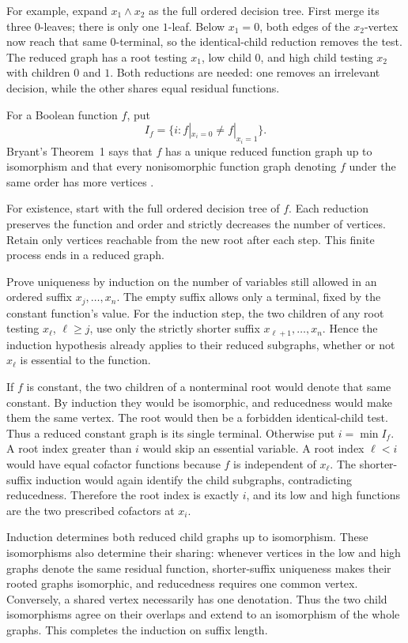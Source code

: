 For example, expand \(x_1\land x_2\) as the full ordered decision tree.
First merge its three \(0\)-leaves; there is only one \(1\)-leaf.
Below \(x_1=0\), both edges of the \(x_2\)-vertex now reach that same
\(0\)-terminal, so the identical-child reduction removes the test.
The reduced
graph has a root testing \(x_1\), low child \(0\), and high child testing
\(x_2\) with children \(0\) and \(1\).  Both reductions are needed: one removes
an irrelevant decision, while the other shares equal residual functions.

For a Boolean function \(f\), put
\[
 I_f=\{i:f|_{x_i=0}\ne f|_{x_i=1}\}.
\]
Bryant's Theorem~1 says that \(f\) has a unique reduced function graph up to
isomorphism and that every nonisomorphic function graph denoting \(f\) under
the same order has more
vertices \cite[thm.~1]{Bryant1986}.

For existence, start with the full ordered decision tree of \(f\).
Each reduction preserves the function and order and strictly decreases
the number of vertices. Retain only vertices reachable from the new
root after each step. This finite process ends in a reduced graph.

Prove uniqueness by induction on the number of variables still
allowed in an ordered suffix \(x_j,\ldots,x_n\). The empty suffix
allows only a terminal, fixed by the constant function's value.
For the induction step, the two children of any root testing
\(x_\ell\), \(\ell\geq j\), use only the strictly shorter suffix
\(x_{\ell+1},\ldots,x_n\). Hence the induction hypothesis already
applies to their reduced subgraphs, whether or not \(x_\ell\)
is essential to the function.

If \(f\) is constant, the two children of a nonterminal root would
denote that same constant. By induction they would be isomorphic,
and reducedness would make them the same vertex. The root would
then be a forbidden identical-child test. Thus a reduced constant
graph is its single terminal.
Otherwise put \(i=\min I_f\). A root index greater than \(i\)
would skip an essential variable. A root index \(\ell<i\)
would have equal cofactor functions because \(f\) is independent
of \(x_\ell\). The shorter-suffix induction would again identify
the child subgraphs, contradicting reducedness. Therefore the
root index is exactly \(i\), and its low and high functions are
the two prescribed cofactors at \(x_i\).

Induction determines both reduced child graphs up to isomorphism.
These isomorphisms also determine their sharing: whenever vertices
in the low and high graphs denote the same residual function,
shorter-suffix uniqueness makes their rooted graphs isomorphic,
and reducedness requires one common vertex. Conversely, a shared
vertex necessarily has one denotation. Thus the two child
isomorphisms agree on their overlaps and extend to an isomorphism
of the whole graphs. This completes the induction on suffix length.

